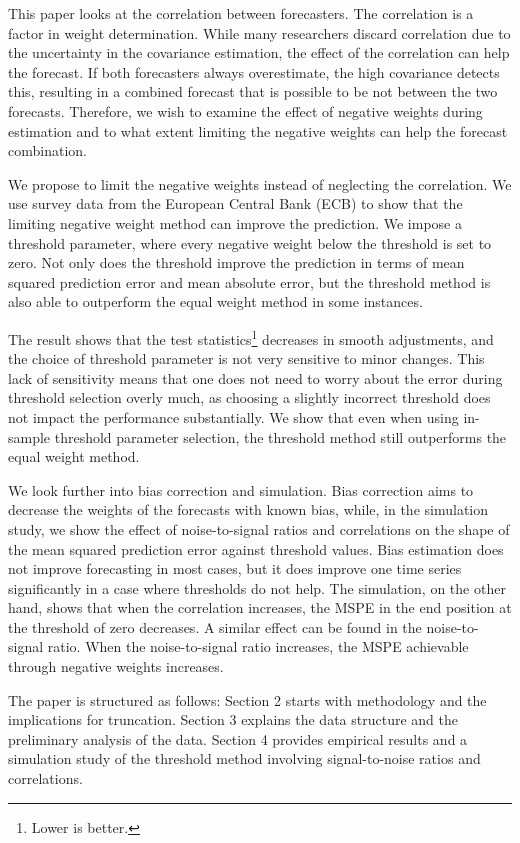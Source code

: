 \documentclass[11pt]{article}
\let\rmarkdownfootnote\footnote%
\def\footnote{\protect\rmarkdownfootnote}
\begin{document}
	This paper looks at the correlation between forecasters. The correlation is a factor in weight determination. While many researchers discard correlation due to the uncertainty in the covariance estimation, the effect of the correlation can help the forecast. If both forecasters always overestimate, the high covariance detects this, resulting in a combined forecast that is possible to be not between the two forecasts. Therefore, we wish to examine the effect of negative weights during estimation and to what extent limiting the negative weights can help the forecast combination.
	
	We propose to limit the negative weights instead of neglecting the correlation. We use survey data from the European Central Bank (ECB) to show that the limiting negative weight method can improve the prediction. We impose a threshold parameter, where every negative weight below the threshold is set to zero. Not only does the threshold improve the prediction in terms of mean squared prediction error and mean absolute error, but the threshold method is also able to outperform the equal weight method in some instances.
	
	The result shows that the test statistics\footnote{Lower is better.} decreases in smooth adjustments, and the choice of threshold parameter is not very sensitive to minor changes. This lack of sensitivity means that one does not need to worry about the error during threshold selection overly much, as choosing a slightly incorrect threshold does not impact the performance substantially. We show that even when using in-sample threshold parameter selection, the threshold method still outperforms the equal weight method.
	
	We look further into bias correction and simulation. Bias correction aims to decrease the weights of the forecasts with known bias, while, in the simulation study, we show the effect of noise-to-signal ratios and correlations on the shape of the mean squared prediction error against threshold values. Bias estimation does not improve forecasting in most cases, but it does improve one time series significantly in a case where thresholds do not help. The simulation, on the other hand, shows that when the correlation increases, the MSPE in the end position at the threshold of zero decreases. A similar effect can be found in the noise-to-signal ratio. When the noise-to-signal ratio increases, the MSPE achievable through negative weights increases.
	
	The paper is structured as follows: Section 2 starts with methodology and the implications for truncation. Section 3 explains the data structure and the preliminary analysis of the data. Section 4 provides empirical results and a simulation study of the threshold method involving signal-to-noise ratios and correlations.
	
\end{document}
